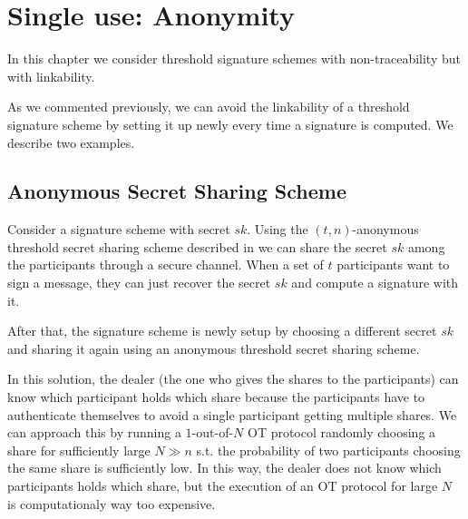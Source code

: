 \chapter{Single use: Anonymity}
\label{chap:single}
In this chapter we consider threshold signature schemes with non-traceability but with linkability.

As we commented previously, we can avoid the linkability of a threshold signature scheme by setting it up newly every time a signature is computed. We describe two examples.

\section{Anonymous Secret Sharing Scheme}
Consider a signature scheme with secret $sk$. Using the $(t,n)$-anonymous threshold secret sharing scheme described in \cite{BlSt97} we can share the secret $sk$ among the participants through a secure channel. When a set of $t$ participants want to sign a message, they can just recover the secret $sk$ and compute a signature with it.

After that, the signature scheme is newly setup by choosing a different secret $sk$ and sharing it again using an anonymous threshold secret sharing scheme.

In this solution, the dealer (the one who gives the shares to the participants) can know which participant holds which share because the participants have to authenticate themselves to avoid a single participant getting multiple shares. We can approach this by running a $1$-out-of-$N$ OT protocol randomly choosing a share for sufficiently large $N \gg n$ s.t. the probability of two participants choosing the same share is sufficiently low. In this way, the dealer does not know which participants holds which share, but the execution of an OT protocol for large $N$ is computationaly way too expensive.

